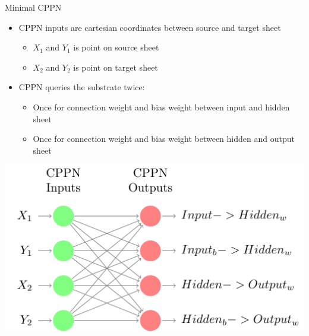 \documentclass[xcolor=dvipsnames]{beamer}
\newcommand\Fontvi{\fontsize{7}{10}\selectfont}
\begin{document}
	\begin{frame}{Minimal CPPN}
		\begin{itemize}
			\item CPPN inputs are cartesian coordinates between source and target sheet
			\begin{itemize}\Fontvi
				\item $X_1$ and $Y_1$ is point on source sheet
				\item $X_2$ and $Y_2$ is point on target sheet
			\end{itemize}
			\item CPPN queries the substrate twice:
			\begin{itemize}\Fontvi
				\item Once for connection weight and bias weight between input and hidden sheet
				\item Once for connection weight and bias weight between hidden and output sheet
			\end{itemize}
		\end{itemize}
		\begin{center}
			\includegraphics[width=\textwidth,height=0.4\textheight,keepaspectratio]{MinimalCppn/MinimalCppn}
		\end{center}
	\end{frame}
	
\end{document}
